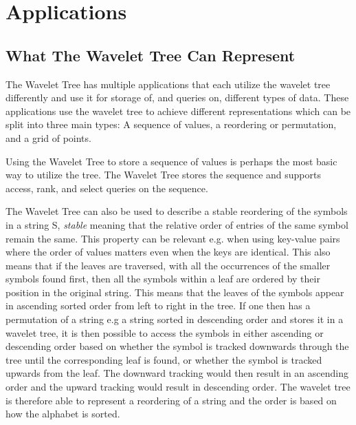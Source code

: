 \section{Applications}
\subsection{What The Wavelet Tree Can Represent}
The Wavelet Tree has multiple applications that each utilize the wavelet tree differently and use it for storage of, and queries on, different types of data.
These applications use the wavelet tree to achieve different representations which can be split into three main types: A sequence of values, a reordering or permutation, and a grid of points.

Using the Wavelet Tree to store a sequence of values is perhaps the most basic way to utilize the tree.
The Wavelet Tree stores the sequence and supports access, rank, and select queries on the sequence.

The Wavelet Tree can also be used to describe a stable reordering of the symbols in a string S, \textit{stable} meaning that the relative order of entries of the same symbol remain the same.
This property can be relevant e.g. when using key-value pairs where the order of values matters even when the keys are identical.
This also means that if the leaves are traversed, with all the occurrences of the smaller symbols found first, then all the symbols within a leaf are ordered by their position in the original string.
This means that the leaves of the symbols appear in ascending sorted order from left to right in the tree.
If one then has a permutation of a string e.g a string sorted in descending order and stores it in a wavelet tree, it is then possible to access the symbols in either ascending or descending order based on whether the symbol is tracked downwards through the tree until the corresponding leaf is found, or whether the symbol is tracked upwards from the leaf. 
The downward tracking would then result in an ascending order and the upward tracking would result in descending order.
The wavelet tree is therefore able to represent a reordering of a string and the order is based on how the alphabet is sorted.

